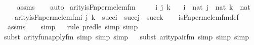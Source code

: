 \begin{isabellebody}
\ \ \isamarkupfalse%
\ assms\isanewline
\ \ \isamarkupfalse%
\ auto%
\endisatagproof
{\isafoldproof}%
%
\isadelimproof
\isanewline
%
\endisadelimproof
\isanewline
{}\isamarkupfalse%
\ arity{\isacharunderscore}{\kern0pt}is{\isacharunderscore}{\kern0pt}Fn{\isacharunderscore}{\kern0pt}perm{\isacharunderscore}{\kern0pt}elem{\isacharunderscore}{\kern0pt}fm\ {\isacharcolon}{\kern0pt}\ \isanewline
\ \ \ i\ j\ k\isanewline
\ \ \ {\isachardoublequoteopen}i\ {\isasymin}\ nat{\isachardoublequoteclose}\ {\isachardoublequoteopen}j\ {\isasymin}\ nat{\isachardoublequoteclose}\ {\isachardoublequoteopen}k\ {\isasymin}\ nat{\isachardoublequoteclose}\ \isanewline
\ \ \ {\isachardoublequoteopen}arity{\isacharparenleft}{\kern0pt}is{\isacharunderscore}{\kern0pt}Fn{\isacharunderscore}{\kern0pt}perm{\isacharunderscore}{\kern0pt}elem{\isacharunderscore}{\kern0pt}fm{\isacharparenleft}{\kern0pt}i{\isacharcomma}{\kern0pt}\ j{\isacharcomma}{\kern0pt}\ k{\isacharparenright}{\kern0pt}{\isacharparenright}{\kern0pt}\ {\isasymle}\ succ{\isacharparenleft}{\kern0pt}i{\isacharparenright}{\kern0pt}\ {\isasymunion}\ succ{\isacharparenleft}{\kern0pt}j{\isacharparenright}{\kern0pt}\ {\isasymunion}\ succ{\isacharparenleft}{\kern0pt}k{\isacharparenright}{\kern0pt}{\isachardoublequoteclose}\isanewline
%
\isadelimproof
\ \ %
\endisadelimproof
%
\isatagproof
{}\isamarkupfalse%
\ is{\isacharunderscore}{\kern0pt}Fn{\isacharunderscore}{\kern0pt}perm{\isacharunderscore}{\kern0pt}elem{\isacharunderscore}{\kern0pt}fm{\isacharunderscore}{\kern0pt}def\isanewline
\ \ \isamarkupfalse%
\ assms\isanewline
\ \ \isamarkupfalse%
\ simp\isanewline
\ \ \isamarkupfalse%
{\isacharparenleft}{\kern0pt}rule\ pred{\isacharunderscore}{\kern0pt}le{\isacharcomma}{\kern0pt}\ simp{\isacharcomma}{\kern0pt}\ simp{\isacharparenright}{\kern0pt}{\isacharplus}{\kern0pt}\isanewline
\ \ \isamarkupfalse%
{\isacharparenleft}{\kern0pt}subst\ arity{\isacharunderscore}{\kern0pt}fun{\isacharunderscore}{\kern0pt}apply{\isacharunderscore}{\kern0pt}fm{\isacharcomma}{\kern0pt}\ simp{\isacharcomma}{\kern0pt}\ simp{\isacharcomma}{\kern0pt}\ simp{\isacharparenright}{\kern0pt}\isanewline
\ \ \isamarkupfalse%
{\isacharparenleft}{\kern0pt}subst\ arity{\isacharunderscore}{\kern0pt}pair{\isacharunderscore}{\kern0pt}fm{\isacharcomma}{\kern0pt}\ simp{\isacharcomma}{\kern0pt}\ simp{\isacharcomma}{\kern0pt}\ simp{\isacharparenright}{\kern0pt}{\isacharplus}{\kern0pt}\isanewline

\end{isabellebody}
